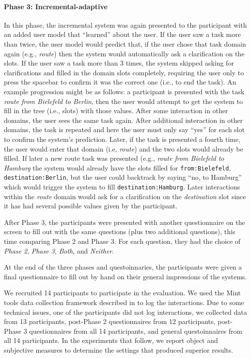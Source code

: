 \documentclass[11pt]{article}
\begin{document}
\paragraph{Phase 3: Incremental-adaptive} In this phase, the incremental system was again presented to the participant with an added user model that ``learned'' about the user. If the user saw a task more than twice, the user model would predict that, if the user chose that task domain again (e.g., \emph{route}) then the system would automatically ask a clarification on the slots. If the user saw a task more than 3 times, the system skipped asking for clarifications and filled in the domain slots completely, requiring the user only to press the spacebar to confirm it was the correct one (i.e., to end the task). An example progression might be as follows: a participant is presented with the task \emph{route from Bielefeld to Berlin}, then the user would attempt to get the system to fill in the tree (i.e., slots) with those values. After some interaction in other domains, the user sees the same task again. After additional interaction in other domains, the task is repeated and here the user must only say ``yes'' for each slot to confirm the system's prediction. Later, if the task is presented a fourth time, the user would enter that domain (i.e, \emph{route}) and the two slots would already be filled. If later a new route task was presented (e.g., \emph{route from Bielefeld to Hamburg} the system would already have the slots filled for \texttt{from:Bielefeld}, \texttt{destination:Berlin}, but the user could backtrack by saying ``no, to Hamburg'' which would trigger the system to fill \texttt{destination:Hamburg}. Later interactions within the \emph{route} domain would ask for a clarification on the \emph{destination} slot since it has had several possible values given by the participant. 

After Phase 3, the participants were presented with another questionnaire on the screen to fill out with the same questions (plus two additional questions), this time comparing Phase 2 and Phase 3. For each question, they had the choice of \emph{Phase 2}, \emph{Phase 3}, \emph{Both}, and \emph{Neither}.

At the end of the three phases and questoinnaries, the participants were given a final questionnaire to fill out by hand on their general impressions of the systems. 

We recruited 14 participants to participate in the evaluation. We used the Mint tools data collection framework described in \cite{kousidis2012evaluating} to log the interactions. Due to some technical issues, one of the participants did not log interactions, we collected data from 13 participants, post-Phase 2 questionnaires from 12 participants,  post-Phase 3 questionnaires from all 14 participants, and general questoinnaires from all 14 participants. In the experiments that follow, we report object and subjective measures to determine the settings that produced superior results.
\end{document}

